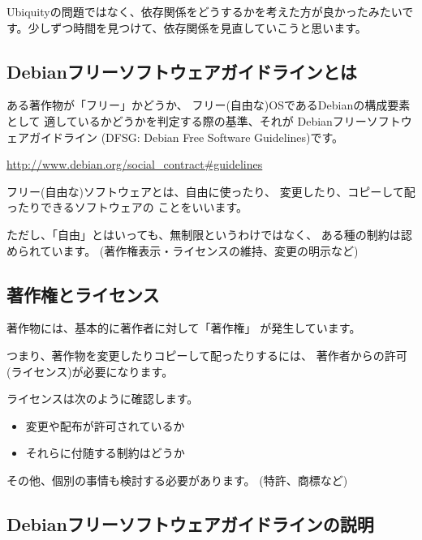 \documentclass[mingoth,a4paper]{jsarticle}
\begin{document}
Ubiquityの問題ではなく、依存関係をどうするかを考えた方が良かったみたいで
す。少しずつ時間を見つけて、依存関係を見直していこうと思います。

\subsection{Debianフリーソフトウェアガイドラインとは}

ある著作物が「フリー」かどうか、
フリー(自由な)OSであるDebianの構成要素として
適しているかどうかを判定する際の基準、それが
Debianフリーソフトウェアガイドライン
(DFSG: Debian Free Software Guidelines)です。

\url{http://www.debian.org/social_contract#guidelines}
 
フリー(自由な)ソフトウェアとは、自由に使ったり、
変更したり、コピーして配ったりできるソフトウェアの
ことをいいます。

ただし、「自由」とはいっても、無制限というわけではなく、
ある種の制約は認められています。
(著作権表示・ライセンスの維持、変更の明示など)

\subsection{著作権とライセンス}

著作物には、基本的に著作者に対して「著作権」
が発生しています。

つまり、著作物を変更したりコピーして配ったりするには、
著作者からの許可(ライセンス)が必要になります。

ライセンスは次のように確認します。

\begin{itemize}
 \item 変更や配布が許可されているか
 \item それらに付随する制約はどうか
\end{itemize}

その他、個別の事情も検討する必要があります。
(特許、商標など)

\newpage
\subsection{Debianフリーソフトウェアガイドラインの説明}
\end{document}
